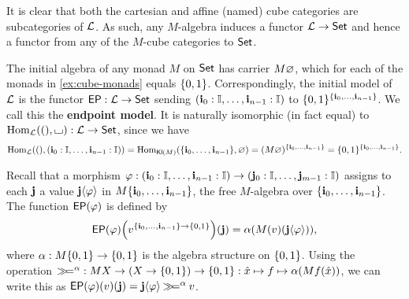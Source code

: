 \documentclass[a4paper]{memoir}
\begin{document}
It is clear that both the cartesian and affine (named) cube categories are subcategories of $\catL$.
As such, any $M$-algebra induces a functor $\catL \to \Set$ and hence a functor from any of the $M$-cube categories to $\Set$.

The initial algebra of any monad $M$ on $\Set$ has carrier $M \eset$, which for each of the monads in \cref{ex:cube-monads} equals $\accol{0, 1}$.
Correspondingly, the initial model of $\catL$ is the functor $\EP : \catL \to \Set$ sending $(\dm{i}_0 : \IX, \ldots, \dm{i}_{n-1} : \IX)$ to $\accol{0, 1}^{\accol{\dm{i}_0, \ldots, \dm{i}_{n-1}}}$.
We call this the \textbf{endpoint model}.
It is naturally isomorphic (in fact equal) to $\Hom_\catL((), \loch) : \catL \to \Set$, since we have
\small \[
	\Hom_\catL((), (\dm{i}_0 : \IX, \ldots, \dm{i}_{n-1} : \IX))
	= \Hom_{\Kleisli(M)}(\accol{\dm{i}_0, \ldots, \dm{i}_{n-1}}, \eset)
	= (M\eset)^{\accol{\dm{i}_0, \ldots, \dm{i}_{n-1}}}
	= \accol{0, 1}^{\accol{\dm{i}_0, \ldots, \dm{i}_{n-1}}}.
\] \normalsize


Recall that a morphism $\vfi : (\dm{i}_0 : \IX, \ldots, \dm{i}_{n-1} : \IX) \to (\dm{j}_0 : \IX, \ldots, \dm{j}_{m-1} : \IX)$ assigns to each $\dm j$ a value $\dm j\psub \vfi$ in $M \accol{\dm{i}_0, \ldots, \dm{i}_{n-1}}$, the free $M$-algebra over $\accol{\dm{i}_0, \ldots, \dm{i}_{n-1}}$.
The function $\EP(\vfi)$ is defined by
\[
	\EP(\vfi)
	\paren{ v^{\accol{\dm{i}_0, \ldots, \dm{i}_{n-1}} \to \accol{0, 1}} }
	(\dm j)
	= \alpha\paren{ M(v)(\dm j \psub \vfi) },
\]
where $\alpha : M\accol{0, 1} \to \accol{0, 1}$ is the algebra structure on $\accol{0, 1}$.
Using the operation $\bindop^\alpha : MX \to (X \to \accol{0, 1}) \to \accol{0, 1} : \hat x \mapsto f \mapsto \alpha (Mf(\hat x))$, we can write this as $\EP(\vfi)(v)(\dm j) = \dm j \psub \vfi \bindop^\alpha v$.
\end{document}
